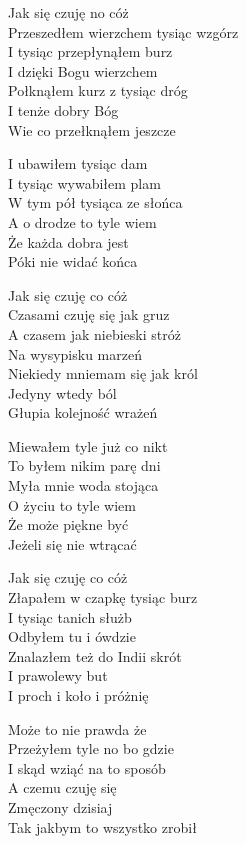 
\begin{text}
    Jak się czuję no cóż\\
    Przeszedłem wierzchem tysiąc wzgórz\\
    I tysiąc przepłynąłem burz\\
    I dzięki Bogu wierzchem\\
    Połknąłem kurz z tysiąc dróg\\
    I tenże dobry Bóg\\
    Wie co przełknąłem jeszcze

    I ubawiłem tysiąc dam\\
    I tysiąc wywabiłem plam\\
    W tym pół tysiąca ze słońca\\
    A o drodze to tyle wiem\\
    Że każda dobra jest\\
    Póki nie widać końca

    Jak się czuję co cóż\\
    Czasami czuję się jak gruz\\
    A czasem jak niebieski stróż\\
    Na wysypisku marzeń\\
    Niekiedy mniemam się jak król\\
    Jedyny wtedy ból\\
    Głupia kolejność wrażeń

    Miewałem tyle już co nikt\\
    To byłem nikim parę dni\\
    Myła mnie woda stojąca\\
    O życiu to tyle wiem\\
    Że może piękne być\\
    Jeżeli się nie wtrącać

    Jak się czuję co cóż\\
    Złapałem w czapkę tysiąc burz\\
    I tysiąc tanich służb\\
    Odbyłem tu i ówdzie\\
    Znalazłem też do Indii skrót\\
    I prawolewy but\\
    I proch i koło i próżnię

    Może to nie prawda że\\
    Przeżyłem tyle no bo gdzie\\
    I skąd wziąć na to sposób\\
    A czemu czuję się\\
    Zmęczony dzisiaj\\
    Tak jakbym to wszystko zrobił
\end{text}
\begin{chord}

\end{chord}